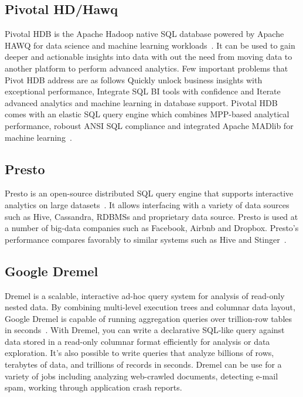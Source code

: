 \subsection{Pivotal HD/Hawq}

Pivotal HDB is the Apache Hadoop native SQL database powered by Apache
HAWQ for data science and machine learning
workloads~\cite{www-apache-hqwq}. It can be used to gain deeper and
actionable insights into data with out the need from moving data to
another platform to perform advanced analytics. Few important problems
that Pivot HDB address are as follows Quickly unlock business insights
with exceptional performance, Integrate SQL BI tools with confidence
and Iterate advanced analytics and machine learning in database
support. Pivotal HDB comes with an elastic SQL query engine which
combines MPP-based analytical performance, roboust ANSI SQL compliance
and integrated Apache MADlib for machine
learning~\cite{www-pivotalhdb}.

     \pv
     
\subsection{Presto}

Presto is an open-source distributed SQL query engine that supports
interactive analytics on large datasets~\cite{www-presto}. It allows
interfacing with a variety of data sources such as Hive, Cassandra,
RDBMSs and proprietary data source. Presto is used at a number of
big-data companies such as Facebook, Airbnb and Dropbox. Presto's
performance compares favorably to similar systems such as Hive and
Stinger~\cite{presto-paper-2014}.

     \pv

\subsection{Google Dremel}
 
Dremel is a scalable, interactive ad-hoc query system for analysis of
read-only nested data. By combining multi-level execution trees and
columnar data layout, Google Dremel is capable of running aggregation
queries over trillion-row tables in seconds~\cite{paper-dremel}. With
Dremel, you can write a declarative SQL-like query against data stored
in a read-only columnar format efficiently for analysis or data
exploration.  It's also possible to write queries that analyze
billions of rows, terabytes of data, and trillions of records in
seconds. Dremel can be use for a variety of jobs including analyzing
web-crawled documents, detecting e-mail spam, working through
application crash reports.

